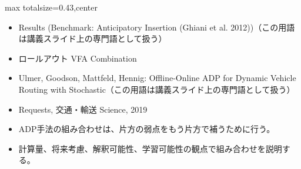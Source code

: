 \clearpage
{}
\begin{minipage}[t]{0.405\textwidth}
\begin{adjustbox}{max totalsize={\textwidth}{0.43\textheight},center}
\begin{minipage}{\textwidth}\scriptsize
{}\begin{itemize}
\item Results (Benchmark: Anticipatory Insertion (Ghiani et al. 2012))（この用語は講義スライド上の専門語として扱う）
\item ロールアウト VFA Combination
\item Ulmer, Goodson, Mattfeld, Hennig: Offline-Online ADP for Dynamic Vehicle Routing with Stochastic（この用語は講義スライド上の専門語として扱う）
\item Requests, 交通・輸送 Science, 2019
\end{itemize}\begin{itemize}
\item ADP手法の組み合わせは、片方の弱点をもう片方で補うために行う。
\item 計算量、将来考慮、解釈可能性、学習可能性の観点で組み合わせを説明する。
\end{itemize}
\end{minipage}
\end{adjustbox}
\end{minipage}\hfill
